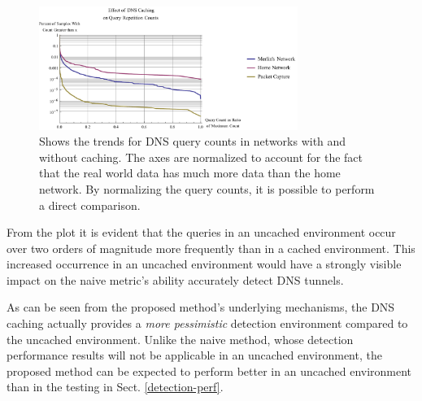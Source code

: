 \documentclass{llncs}
\begin{document}
\begin{figure}[h]
\centering
\includegraphics[width=0.75\textwidth]{../figures/caching.pdf}
\caption[Effect of DNS Caching on Query Counts]{Shows the trends for DNS query
counts in networks with and without caching. The axes are normalized to account
for the fact that the real world data has much more data than the home network.
By normalizing the query counts, it is possible to perform a direct comparison.}
\label{caching}
\end{figure}

From the plot
it is evident that the queries in an uncached environment occur over two
orders of magnitude more frequently than in a cached environment. This increased
occurrence in an uncached environment would have a strongly visible impact on
the naive metric's ability accurately detect DNS tunnels.

As can be seen from the proposed method's underlying mechanisms, the DNS caching
actually provides a \emph{more pessimistic} detection environment compared to
the uncached environment. Unlike the naive method, whose detection performance
results will not be applicable in an uncached environment, the proposed method
can be expected to perform better in an uncached environment than in the
testing in Sect. \ref{detection-perf}.

\end{document}
